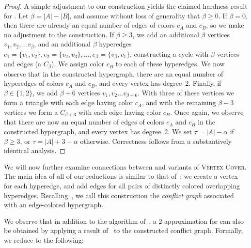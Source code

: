 \begin{proof}
    A simple adjustment to our construction yields the claimed hardness result for \cfmaxECC{}.
    Let $\beta = |A| - |B|$, and assume without loss of generality that $\beta \geq 0$.
    If $\beta = 0$, then there are already an equal number of edges of colors $c_A$ and $c_B$, so we make no adjustment to the construction.
    If $\beta \geq 3$, we add an additional $\beta$ vertices $v_1, v_2, \ldots v_\beta$,
    and an additional $\beta$ hyperedges $e_1 = \{v_1, v_2\}, e_2 = \{v_2, v_3\}, \ldots, e_\beta = \{v_\beta, v_1\}$, constructing a cycle with $\beta$ vertices and edges (a $C_\beta$).
    We assign color $c_B$ to each of these hyperedges. We now observe that in the constructed hypergraph, there are an equal number of
    hyperedges of colors $c_A$ and $c_B$, and every vertex has degree~$2$.
    Finally, if $\beta \in \{1, 2\}$, we add $\beta + 6$ vertices $v_1, v_2 \ldots v_{\beta + 6}$. With three of these vertices we form a triangle
    with each edge having color $c_A$, and with the remaining $\beta + 3$ vertices we form a $C_{\beta+3}$ with each edge having color $c_B$.
    Once again, we observe that there are now an equal number of edges of colors $c_A$ and $c_B$ in the constructed hypergraph, and every vertex has degree~$2$.
    We set $\tau = |A| - \alpha$ if $\beta \geq 3$, or $\tau = |A| + 3 - \alpha$ otherwise.
    Correctness follows from a substantively identical analysis.
\end{proof}
%
We will now further examine connections between \cfminECC{} and variants of \textsc{Vertex Cover}.
The main idea of all of our reductions is similar to that of~\citet{veldt2023optimal}; we create a vertex for each hyperedge, and add edges for all pairs of distinctly colored overlapping hyperedges.
Recalling~, we call this construction the \emph{conflict graph} associated with an edge-colored hypergraph.

We observe that in addition to the algorithm of~, a $2$-approximation for \cfminECC{} can also be obtained
by applying a result of~\citet{blum2022sparse} to the constructed conflict graph. Formally, we reduce to the following:

